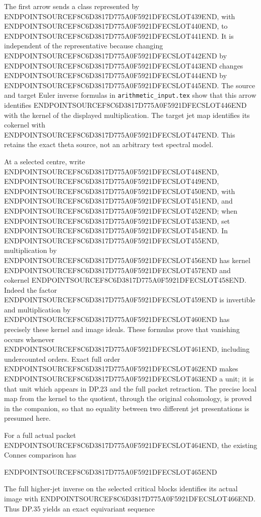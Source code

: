 The first arrow sends a class represented by ENDPOINTSOURCEF8C6D3817D775A0F5921DFECSLOT439END, with ENDPOINTSOURCEF8C6D3817D775A0F5921DFECSLOT440END, to ENDPOINTSOURCEF8C6D3817D775A0F5921DFECSLOT441END. It is independent of the representative because changing ENDPOINTSOURCEF8C6D3817D775A0F5921DFECSLOT442END by ENDPOINTSOURCEF8C6D3817D775A0F5921DFECSLOT443END changes ENDPOINTSOURCEF8C6D3817D775A0F5921DFECSLOT444END by ENDPOINTSOURCEF8C6D3817D775A0F5921DFECSLOT445END. The source and target Euler inverse formulas in \texttt{arithmetic\_input.tex} show that this arrow identifies ENDPOINTSOURCEF8C6D3817D775A0F5921DFECSLOT446END with the kernel of the displayed multiplication. The target jet map identifies its cokernel with ENDPOINTSOURCEF8C6D3817D775A0F5921DFECSLOT447END. This retains the exact theta source, not an arbitrary test spectral model.

At a selected centre, write ENDPOINTSOURCEF8C6D3817D775A0F5921DFECSLOT448END, ENDPOINTSOURCEF8C6D3817D775A0F5921DFECSLOT449END, ENDPOINTSOURCEF8C6D3817D775A0F5921DFECSLOT450END, with ENDPOINTSOURCEF8C6D3817D775A0F5921DFECSLOT451END, and ENDPOINTSOURCEF8C6D3817D775A0F5921DFECSLOT452END; when ENDPOINTSOURCEF8C6D3817D775A0F5921DFECSLOT453END, set ENDPOINTSOURCEF8C6D3817D775A0F5921DFECSLOT454END. In ENDPOINTSOURCEF8C6D3817D775A0F5921DFECSLOT455END, multiplication by ENDPOINTSOURCEF8C6D3817D775A0F5921DFECSLOT456END has kernel ENDPOINTSOURCEF8C6D3817D775A0F5921DFECSLOT457END and cokernel ENDPOINTSOURCEF8C6D3817D775A0F5921DFECSLOT458END. Indeed the factor ENDPOINTSOURCEF8C6D3817D775A0F5921DFECSLOT459END is invertible and multiplication by ENDPOINTSOURCEF8C6D3817D775A0F5921DFECSLOT460END has precisely these kernel and image ideals. These formulas prove that vanishing occurs whenever ENDPOINTSOURCEF8C6D3817D775A0F5921DFECSLOT461END, including undercounted orders. Exact full order ENDPOINTSOURCEF8C6D3817D775A0F5921DFECSLOT462END makes ENDPOINTSOURCEF8C6D3817D775A0F5921DFECSLOT463END a unit; it is that unit which appears in DP.23 and the full packet retraction. The precise local map from the kernel to the quotient, through the original cohomology, is proved in the companion, so that no equality between two different jet presentations is presumed here.

For a full actual packet ENDPOINTSOURCEF8C6D3817D775A0F5921DFECSLOT464END, the existing Connes comparison has

ENDPOINTSOURCEF8C6D3817D775A0F5921DFECSLOT465END

The full higher-jet inverse on the selected critical blocks identifies its actual image with ENDPOINTSOURCEF8C6D3817D775A0F5921DFECSLOT466END. Thus DP.35 yields an exact equivariant sequence

